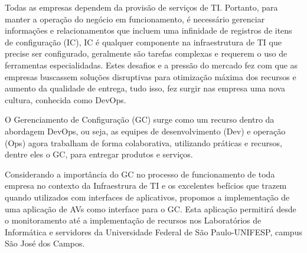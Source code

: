 \documentclass[quali]{mpit}
\begin{document}
Todas as empresas dependem da provisão de serviços de TI. Portanto, para manter a operação do negócio em funcionamento, é necessário gerenciar informações e relacionamentos que incluem uma infinidade de registros de itens de configuração (IC), IC é qualquer componente na infraestrutura de TI que precise ser configurado, geralmente são tarefas complexas e requerem o uso de ferramentas especialidadas. Estes desafios e a pressão do mercado fez com que as empresas buscassem soluções disruptivas para otimização máxima dos recursos e aumento da qualidade de entrega, tudo isso, fez surgir nas empresa uma nova cultura, conhecida como DevOps.

O Gerenciamento de Configuração (GC) surge como um recurso dentro  da abordagem DevOps, ou seja, as equipes de desenvolvimento (Dev) e operação (Ops) agora trabalham de forma colaborativa, utilizando práticas e recursos, dentre eles o GC, para entregar produtos e serviços. 

Considerando a importância do GC no processo de funcionamento de toda empresa no contexto da Infraestrura de TI e os excelentes befícios que trazem quando utilizados com interfaces de aplicativos, propomos a implementação de uma aplicação de AVs como interface para o GC. Esta aplicação permitirá desde o monitoramento até a implementação de recursos nos Laboratórios de Informática e servidores da Universidade Federal de São Paulo-UNIFESP, campus São José dos Campos. 
\end{document}
